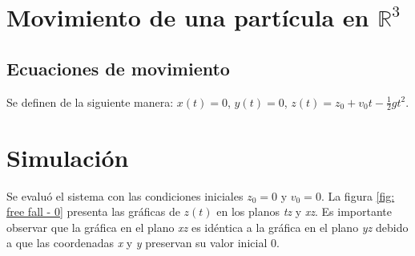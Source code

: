 \documentclass[letterpaper,12pt]{article}
\title{}
\author{Isaac Ayala Lozano}
\date{}
\begin{document}

\section{Movimiento de una part\'icula en $\mathbb{R}^3$}

 \subsection{Ecuaciones de movimiento}
 
 Se definen de la siguiente manera: $ x(t) = 0$, $y (t) = 0 $, $z (t) = z_0 + v_0 t - \frac{1}{2} g t^2$.

 \section{Simulaci\'on}
 
 Se evalu\'o el sistema con las condiciones iniciales $z_0 = 0$ y $v_0 = 0$. La figura \ref{fig: free fall - 0} presenta las gr\'aficas de $z(t)$ en los planos \emph{tz} y \emph{xz}. Es importante observar que la gr\'afica en el plano \emph{xz} es id\'entica a la gr\'afica en el plano \emph{yz} debido a que las coordenadas \emph{x} y \emph{y} preservan su valor inicial 0.
 
\end{document}
